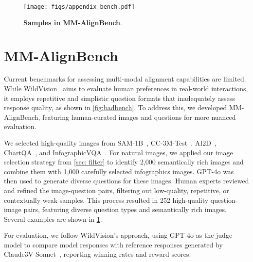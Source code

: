 \begin{figure}[t]
    \centering
    \texttt{[image: figs/appendix\_bench.pdf]}
    \caption{\textbf{Samples in MM-AlignBench}.}
    \label{fig:bench}
    \vspace{-10pt}
\end{figure}

\section{MM-AlignBench}

Current benchmarks for assessing multi-modal alignment capabilities are limited. While WildVision~\cite{lu2024wildvision} aims to evaluate human preferences in real-world interactions, 
it employs repetitive and simplistic question formats that inadequately assess response quality, as shown in \cref{fig:badbench}. 
To address this, we developed MM-AlignBench, featuring human-curated images and questions for more nuanced evaluation.

We selected high-quality images from SAM-1B~\cite{kirillov2023segment}, CC-3M-Test~\cite{sharma2018conceptual}, AI2D~\cite{kembhavi2016diagram}, ChartQA~\cite{masry2022chartqa}, and InfographicVQA~\cite{mathew2022infographicvqa}. 
For natural images, we applied our image selection strategy from \cref{sec: filter} to identify 2,000 semantically rich images and combine them with 1,000 carefully selected infographics images. 
GPT-4o was then used to generate diverse questions for these images. 
Human experts reviewed and refined the image-question pairs, filtering out low-quality, repetitive, or contextually weak samples. 
This process resulted in 252 high-quality question-image pairs, 
featuring diverse question types and semantically rich images.
Several examples are shown in \cref{fig:bench}.

For evaluation, we follow WildVision’s approach, using GPT-4o as the judge model to compare model responses with reference responses generated by Claude3V-Sonnet~\cite{Claude3}, reporting winning rates and reward scores.



